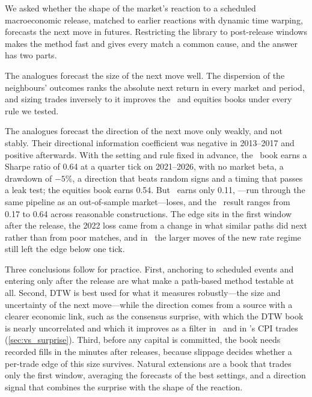 
We asked whether the shape of the market's reaction to a scheduled macroeconomic release, matched
to earlier reactions with dynamic time warping, forecasts the next move in futures. Restricting
the library to post-release windows makes the method fast and gives every match a common cause,
and the answer has two parts.

The analogues forecast the size of the next move well. The dispersion of the neighbours' outcomes
ranks the absolute next return in every market and period, and sizing trades inversely to it
improves the \ES\ and equities books under every rule we tested.

The analogues forecast the direction of the next move only weakly, and not stably. Their
directional information coefficient was negative in 2013--2017 and positive afterwards. With the
setting and rule fixed in advance, the \ES\ book earns a Sharpe ratio of 0.64 at a quarter tick on
2021--2026, with no market beta, a drawdown of $-5\%$, a direction that beats random signs and a
timing that passes a leak test; the equities book earns 0.54. But \NQ\ earns only 0.11, \YM---run
through the same pipeline as an out-of-sample market---loses, and the \ES\ result ranges from 0.17
to 0.64 across reasonable constructions. The edge sits in the first window after the release, the
2022 loss came from a change in what similar paths did next rather than from poor matches, and in
\ZN\ the larger moves of the new rate regime still left the edge below one tick.

Three conclusions follow for practice. First, anchoring to scheduled events and entering only
after the release are what make a path-based method testable at all. Second, DTW is best used for
what it measures robustly---the size and uncertainty of the next move---while the direction comes
from a source with a clearer economic link, such as the consensus surprise, with which the DTW
book is nearly uncorrelated and which it improves as a filter in \YM\ and in \ES's CPI trades
(\ref{sec:vs_surprise}). Third, before any capital is committed, the book needs recorded fills
in the minutes after releases, because slippage decides whether a per-trade edge of this size
survives. Natural extensions are a book that trades only the first window, averaging the
forecasts of the best settings, and a direction signal that combines the surprise with the shape
of the reaction.
